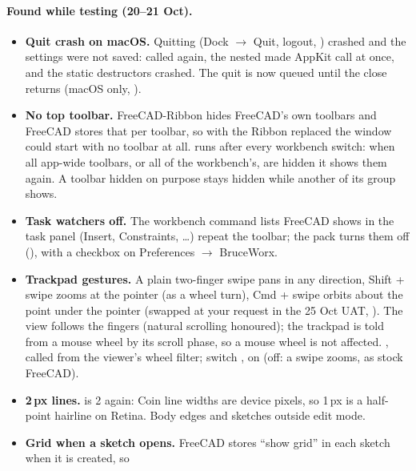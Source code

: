 \paragraph{Found while testing (20--21 Oct).}
\begin{itemize}[nosep]
  \item \textbf{Quit crash on macOS.} Quitting (Dock $\rightarrow$ Quit, logout, )
        crashed and the settings were not saved:  called  again, the
        nested  made AppKit call  at once, and the static destructors
        crashed. The quit is now queued until the close returns (macOS only, ).
  \item \textbf{No top toolbar.} FreeCAD-Ribbon hides FreeCAD's own toolbars and FreeCAD stores that per toolbar,
        so with the Ribbon replaced the window could start with no toolbar at all.
         runs after every workbench switch: when all app-wide
        toolbars, or all of the workbench's, are hidden it shows them again. A toolbar hidden on purpose stays
        hidden while another of its group shows.
  \item \textbf{Task watchers off.} The workbench command lists FreeCAD shows in the task panel (Insert,
        Constraints, \ldots) repeat the toolbar; the pack turns them off (), with a
        checkbox on Preferences $\rightarrow$ BruceWorx.
  \item \textbf{Trackpad gestures.} A plain two-finger swipe pans in any direction, Shift + swipe zooms at the
        pointer (as a wheel turn), Cmd + swipe orbits about the point under the pointer (swapped at your request in
        the 25 Oct UAT, ). The view follows the fingers (natural scrolling honoured); the trackpad is
        told from a mouse wheel by its scroll phase, so a mouse wheel is not affected.
        , called from the viewer's wheel filter; switch
        , on (off: a swipe zooms, as stock FreeCAD).
  \item \textbf{2\,px lines.}  is 2 again: Coin line widths are device pixels, so
        1\,px is a half-point hairline on Retina. Body edges and sketches outside edit mode.
  \item \textbf{Grid when a sketch opens.} FreeCAD stores ``show grid'' in each sketch when it is created, so

\end{itemize}
